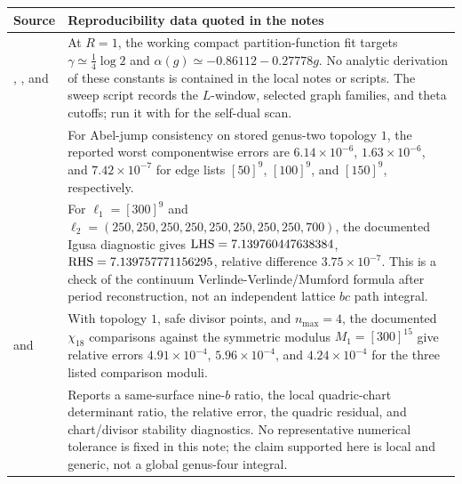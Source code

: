 \documentclass[11pt]{article}
\numberwithin{equation}{section}
\begin{document}
\begin{center}
\begin{tabular}{L{0.31\textwidth}L{0.61\textwidth}}
\hline
Source & Reproducibility data quoted in the notes \\
\hline
{}, , and
 &
At \(R=1\), the working compact partition-function fit targets
\(\gamma\simeq \frac14\log2\) and
\(\alpha(g)\simeq -0.86112-0.27778g\).  No analytic derivation of these
constants is contained in the local notes or scripts.  The sweep script records
the \(L\)-window, selected graph families, and theta cutoffs; run it with
 for the self-dual scan.
\\
 &
For Abel-jump consistency on stored genus-two topology \(1\), the reported
worst componentwise errors are \(6.14\times10^{-6}\), \(1.63\times10^{-6}\),
and \(7.42\times10^{-7}\) for edge lists \([50]^9\), \([100]^9\), and
\([150]^9\), respectively. \\
 &
For \(\ell_1=[300]^9\) and
\(\ell_2=(250,250,250,250,250,250,250,250,700)\), the documented Igusa
diagnostic gives \( {\rm LHS}=7.139760447638384\),
\({\rm RHS}=7.139757771156295\), relative difference
\(3.75\times10^{-7}\).  This is a check of the continuum
Verlinde-Verlinde/Mumford formula after period reconstruction, not an
independent lattice \(bc\) path integral. \\
 and
 &
With topology \(1\), safe divisor points, and \(n_{\max}=4\), the documented
\(\chi_{18}\) comparisons against the symmetric modulus \(M_1=[300]^{15}\)
give relative errors \(4.91\times10^{-4}\), \(5.96\times10^{-4}\), and
\(4.24\times10^{-4}\) for the three listed comparison moduli. \\
 &
Reports a same-surface nine-\(b\) ratio, the local quadric-chart determinant
ratio, the relative error, the quadric residual, and chart/divisor stability
diagnostics.  No representative numerical tolerance is fixed in this note; the
claim supported here is local and generic, not a global genus-four integral. \\
\hline
\end{tabular}
\end{center}
\end{document}
